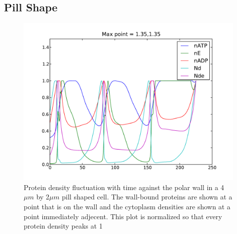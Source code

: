 \documentclass[letterpaper,twocolumn,amsmath,amssymb,pre]{revtex4-1}
\begin{document}
\subsection{Pill Shape}
\begin{figure}
  \includegraphics[width=\columnwidth]{../data/shape-p/plots/frequency_plot_all_norm-p-40-20-0-0-150.pdf}
  \caption{Protein density fluctuation with time against the polar
    wall in a 4$\mu m$ by 2$\mu m$ pill shaped cell.  The wall-bound
    proteins are shown at a point that is on the wall and the
    cytoplasm densities are shown at a point immediately adjecent.
    This plot is normalized so that every protein density peaks at 1}
  \label{frequency-plot-40-20-0-0-150}
\end{figure}
\end{document}
